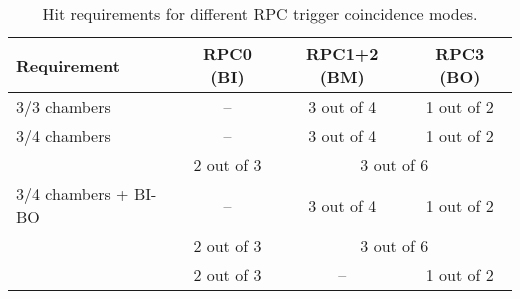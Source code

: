 \begin{table}[htbp]
  \centering
  \caption{Hit requirements for different RPC trigger coincidence modes.}
  \label{tab:RPC_coincidence_modes}
  \begin{tabular}{lccc}
    \hline
    Requirement & RPC0 (BI) & RPC1+2 (BM) & RPC3 (BO) \\
    \hline
    3/3 chambers          & --         & 3 out of 4 & 1 out of 2 \\
    \hline
    3/4 chambers          & --         & 3 out of 4 & 1 out of 2 \\
                          & 2 out of 3 & \multicolumn{2}{c}{3 out of 6} \\
    \hline
    3/4 chambers + BI-BO  & --         & 3 out of 4 & 1 out of 2 \\
                          & 2 out of 3 & \multicolumn{2}{c}{3 out of 6} \\
                          & 2 out of 3 & --         & 1 out of 2 \\
    \hline
  \end{tabular}
\end{table}